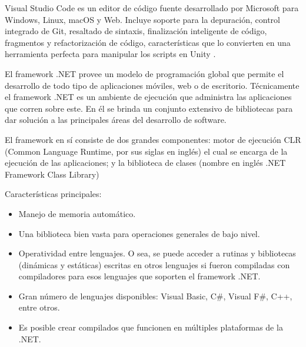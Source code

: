 Visual Studio Code es un editor de código fuente desarrollado por Microsoft para Windows, Linux, macOS y Web. Incluye soporte para la depuración, control integrado de Git, resaltado de sintaxis, finalización inteligente de código, fragmentos y refactorización de código, características que lo convierten en una herramienta perfecta para manipular los scripts en Unity \cite{vscode}.

El framework .NET provee un modelo de programación global que permite el desarrollo de todo tipo de aplicaciones móviles, web o de escritorio. Técnicamente el framework .NET es un ambiente de ejecución que administra las aplicaciones que corren sobre este. En él se brinda un conjunto extensivo de bibliotecas para dar solución a las principales áreas del desarrollo de software.

El framework en sí consiste de dos grandes componentes: motor de ejecución CLR (Common Language Runtime, por sus siglas en inglés) el cual se encarga de la ejecución de las aplicaciones; y la biblioteca de clases (nombre en inglés .NET Framework Class Library)~\cite{netframework}

Características principales:
\begin{itemize}
    \item Manejo de memoria automático.
    \item Una biblioteca bien vasta para operaciones generales de bajo nivel.
    \item Operatividad entre lenguajes. O sea, se puede acceder a rutinas y bibliotecas (dinámicas y estáticas) escritas en otros lenguajes si fueron compiladas con compiladores para esos lenguajes que soporten el framework .NET.
    \item Gran número de lenguajes disponibles: Visual Basic, C\#, Visual F\#, C++, entre otros.
    \item Es posible crear compilados que funcionen en múltiples plataformas de la .NET.
\end{itemize}